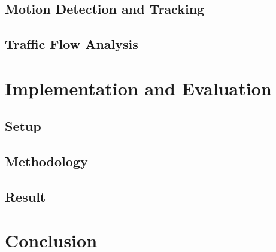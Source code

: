 \documentclass[conference]{IEEEtran}
\begin{document}
	
	\subsection{Motion Detection and Tracking}
	
	
	
	\subsection{Traffic Flow Analysis}
	
	
	
\section{Implementation and Evaluation}
	\subsection{Setup}
	\subsection{Methodology}
	\subsection{Result}



\section{Conclusion}
\end{document}
